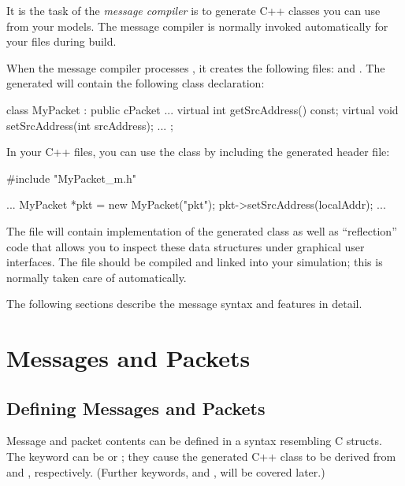It is the task of the \textit{message compiler} is to generate C++ classes
you can use from your models. The message compiler is normally invoked
automatically for your  files during build.

When the message compiler processes , it creates the
following files:  and . The
generated  will contain the following class declaration:

\begin{cpp}
class MyPacket : public cPacket {
    ...
    virtual int getSrcAddress() const;
    virtual void setSrcAddress(int srcAddress);
    ...
};
\end{cpp}

In your C++ files, you can use the  class by including the
generated header file:

\begin{cpp}
#include "MyPacket_m.h"

...
MyPacket *pkt = new MyPacket("pkt");
pkt->setSrcAddress(localAddr);
...
\end{cpp}

The  file will contain implementation of the generated
 class as well as ``reflection'' code that allows you to
inspect these data structures under graphical user interfaces. The
 file should be compiled and linked into your
simulation; this is normally taken care of automatically.

The following sections describe the message syntax and features in detail.



\section{Messages and Packets}
\label{sec:ch-msg-defs:messages-and-packets}

\subsection{Defining Messages and Packets}
\label{sec:ch-msg-defs:defining-messages-and-packets}

Message and packet contents can be defined in a syntax resembling C structs.
The keyword can be  or ; they cause
the generated C++ class to be derived from  and
, respectively. (Further keywords,  and
, will be covered later.)

